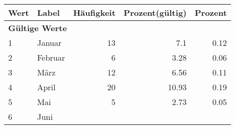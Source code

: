      \begin{longtable}{lXrrr}
     \toprule
     \textbf{Wert} & \textbf{Label} & \textbf{Häufigkeit} & \textbf{Prozent(gültig)} & \textbf{Prozent} \\
     \endhead
     \midrule
     \multicolumn{5}{l}{\textbf{Gültige Werte}}\\

     1 &
     \multicolumn{1}{X}{ Januar   } &


       \num{13} &
       \num[round-mode=places,round-precision=2]{7.1} &
         \num[round-mode=places,round-precision=2]{0.12} \\

     2 &
     \multicolumn{1}{X}{ Februar   } &


       \num{6} &
       \num[round-mode=places,round-precision=2]{3.28} &
         \num[round-mode=places,round-precision=2]{0.06} \\

     3 &
     \multicolumn{1}{X}{ März   } &


       \num{12} &
       \num[round-mode=places,round-precision=2]{6.56} &
         \num[round-mode=places,round-precision=2]{0.11} \\

     4 &
     \multicolumn{1}{X}{ April   } &


       \num{20} &
       \num[round-mode=places,round-precision=2]{10.93} &
         \num[round-mode=places,round-precision=2]{0.19} \\

     5 &
     \multicolumn{1}{X}{ Mai   } &


       \num{5} &
       \num[round-mode=places,round-precision=2]{2.73} &
         \num[round-mode=places,round-precision=2]{0.05} \\

     6 &
     \multicolumn{1}{X}{ Juni   } &



\end{longtable}
